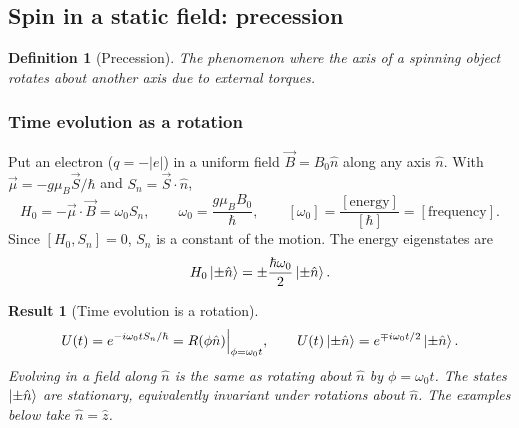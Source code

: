 \documentclass{article}
\newtheorem{definition}{Definition}
\newtheorem{result}{Result}
\begin{document}
\subsection{Spin in a static field: precession}
\label{sec:precession}
\begin{definition}[Precession]
    The phenomenon where the axis of a spinning object rotates about another axis due to external torques.
\end{definition}

\subsubsection{Time evolution as a rotation}
Put an electron ($q = -|e|$) in a uniform field $\vec{B} = B_0\hat{n}$ along any axis $\hat{n}$. With $\vec{\mu} = -g\mu_B\vec{S}/\hbar$ and $S_n = \vec{S}\cdot\hat{n}$,
\begin{equation}
    H_0 = -\vec{\mu}\cdot\vec{B} = \omega_0S_n, \qquad \omega_0 = \frac{g\mu_BB_0}{\hbar}, \qquad [\omega_0] = \frac{[\text{energy}]}{[\hbar]} = [\text{frequency}].
\end{equation}
Since $[H_0,S_n] = 0$, $S_n$ is a constant of the motion. The energy eigenstates are
\[H_0\ket{\pm\hat{n}} = \pm\frac{\hbar\omega_0}{2}\ket{\pm\hat{n}}.\]
\begin{result}[Time evolution is a rotation]
    \begin{equation}
        U(t) = e^{-i\omega_0tS_n/\hbar} = R(\phi\hat{n})\Big|_{\phi = \omega_0t}, \qquad U(t)\ket{\pm\hat{n}} = e^{\mp i\omega_0t/2}\ket{\pm\hat{n}}.
    \end{equation}
    Evolving in a field along $\hat{n}$ is the same as rotating about $\hat{n}$ by $\phi = \omega_0t$. The states $\ket{\pm\hat{n}}$ are stationary, equivalently invariant under rotations about $\hat{n}$. The examples below take $\hat{n} = \hat{z}$.
\end{result}
\end{document}

